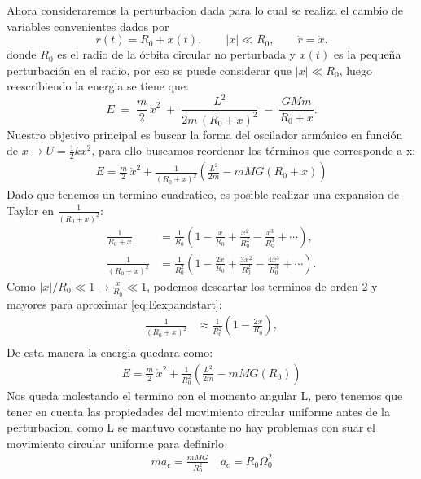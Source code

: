 \documentclass[
  11pt,
  letterpaper,
   addpoints,
  ]{exam}
\begin{document}
\begin{questions}
\begin{solution}
Ahora consideraremos la perturbacion dada para lo cual se realiza el cambio de variables convenientes dados por
\begin{equation}
r(t)=R_0+x(t), \qquad |x|\ll R_0, \qquad \dot r=\dot x.
\end{equation}
donde $R_0$ es el radio de la órbita circular no perturbada y $x(t)$ es la pequeña perturbación en el radio, por eso se puede considerar que $|x|\ll R_0$, luego reescribiendo la energia se tiene que:
\begin{equation}
E \;=\; \frac{m}{2}\,\dot x^{2}
\;+\; \frac{L^{2}}{2m\,(R_0+x)^{2}}
\;-\; \frac{GMm}{R_0+x}.
\label{eq:Eexpandstart}
\end{equation}
Nuestro objetivo principal es buscar la forma del oscilador armónico en función de $x \rightarrow U = \frac{1}{2}kx^{2}$, para ello buscamos reordenar los términos que corresponde a x:
\begin{align}
  E= \frac{m}{2}\,\dot x^{2} + \frac{1}{(R_{0}+x)^{2}}\left(\frac{L^{2}}{2m} - mMG(R_{0}+x)\right)
\end{align}
Dado que tenemos un termino cuadratico, es posible realizar una expansion de Taylor en $\frac{1}{(R_0+x)^{2}}$:
\begin{align}
\frac{1}{R_0+x}
&= \frac{1}{R_0}\left(1-\frac{x}{R_0}+\frac{x^{2}}{R_0^{2}}-\frac{x^{3}}{R_0^{3}}+\cdots\right),\\[2mm]
\frac{1}{(R_0+x)^{2}}
&= \frac{1}{R_0^{2}}\left(1-\frac{2x}{R_0}+\frac{3x^{2}}{R_0^{2}}-\frac{4x^{3}}{R_0^{3}}+\cdots\right).
\end{align}
Como $|x|/R_0\ll 1 \rightarrow \frac{x}{R_{0} }\ll 1$, podemos descartar los terminos de orden 2 y mayores para aproximar \eqref{eq:Eexpandstart}:
\begin{align}
  \frac{1}{(R_0+x)^{2}} &\approx \frac{1}{R_0^{2}}\left(1-\frac{2x}{R_0}\right),\\[2mm]
\end{align}
De esta manera la energia quedara como:
\begin{align}
  E= \frac{m}{2}\,\dot x^{2} +\frac{1}{R_0^{2}}\left(\frac{L^{2}}{2m} - mMG(R_0)\right)
\end{align}
Nos queda molestando el termino con el momento angular L, pero tenemos que tener en cuenta las propiedades del movimiento circular uniforme antes de la perturbacion, como L se mantuvo constante no hay problemas con suar el movimiento circular uniforme para definirlo
\begin{align}
  ma_{c} = \frac{mMG}{R_{0}^{2}} \quad a_{c} = R_{0}\Omega_{0}^{2}

\end{align}
\end{solution}
\end{questions}
\end{document}
